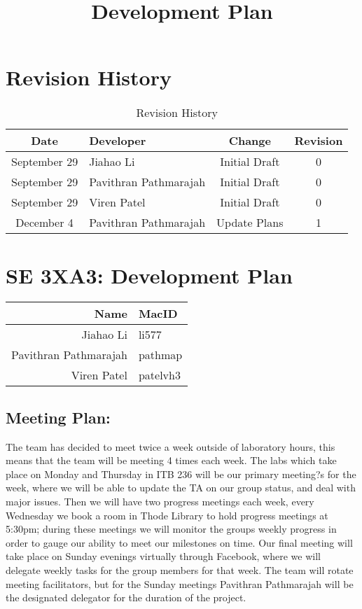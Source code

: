 \documentclass{article}
\begin{document}

\newpage
\title{Development Plan}
\hfill \break
\section*{Revision History}
\begin{table}[h!]
  \centering
  \caption{Revision History}
  \label{tab:table1}
  \begin{tabular}{clcc}
	\toprule
	Date &  Developer & Change & Revision\\
	\midrule
	September 29&Jiahao Li &Initial Draft &0\\
	September 29&Pavithran Pathmarajah &Initial Draft &0\\
	September 29&Viren Patel  &Initial Draft &0\\
	\midrule
	December 4&Pavithran Pathmarajah &Update Plans &1\\
	\bottomrule
  \end{tabular}
\end{table}



\newpage
{}

\section*{SE 3XA3: Development Plan}

\begin{table}[h!]

  \begin{tabular}{r l}
	\toprule
	Name &  MacID \\
	\midrule
	Jiahao Li & li577 \\
	Pavithran Pathmarajah & pathmap\\
	Viren Patel  & patelvh3\\
	\bottomrule
  \end{tabular}
\end{table}


\subsection*{Meeting Plan:}  
The team has decided to meet twice a week outside of laboratory hours, this
means that the team will be meeting 4 times each week. The labs which take place
on Monday and Thursday in ITB 236 will be our primary meeting?s for the week,
where we will be able to update the TA on our group status, and deal with major
issues. Then we will have two progress meetings each week, every Wednesday we
book a room in Thode Library to hold progress meetings at 5:30pm; during these
meetings we will monitor the groups weekly progress in order to gauge our
ability to meet our milestones on time. Our final meeting will take place on
Sunday evenings virtually through Facebook, where we will delegate weekly tasks
for the group members for that week. The team will rotate meeting facilitators,
but for the Sunday meetings Pavithran Pathmarajah will be the designated
delegator for the duration of the project.
\end{document}
